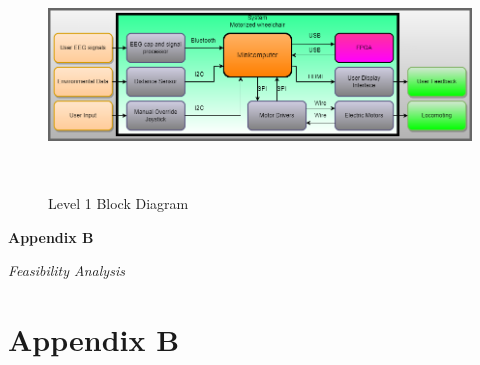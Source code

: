 \documentclass[conference]{IEEEtran}
\begin{document}
    \begin{figure}[htbp]
            \centerline{\includegraphics[height=2.4in,keepaspectratio]{figs/Level_1_Diagram_Figure_A.3_2.png}}
            \caption{Level 1 Block Diagram}
            \label{fig:level-1}
        \end{figure}    
    \twocolumn

\clearpage
\onecolumn
\begin{center}
    \vspace*{5cm}
     {\Huge\bfseries Appendix B \par}
     \vspace{1cm}
    \textit{Feasibility Analysis} \\
\end{center}
\clearpage
\twocolumn
\setcounter{section}{2}
\renewcommand{\thesubsection}{B.\Alph{subsection}}

\section*{\textbf{Appendix B}}

    \setcounter{subsection}{0}
\end{document}
